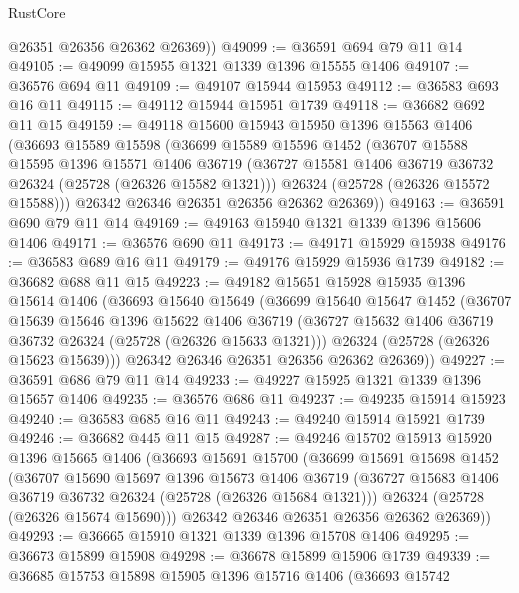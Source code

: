 \begin{lexlean}{RustCore}
\begin{coremodule}
        @26351
        @26356
        @26362
        @26369))
@49099 := @36591 @694 @79 @11 @14
@49105 := @49099 @15955 @1321 @1339 @1396 @15555 @1406
@49107 := @36576 @694 @11
@49109 := @49107 @15944 @15953
@49112 := @36583 @693 @16 @11
@49115 := @49112 @15944 @15951 @1739
@49118 := @36682 @692 @11 @15
@49159 := @49118
    @15600
    @15943
    @15950
    @1396
    @15563
    @1406
    (@36693
      @15589
      @15598
      (@36699
        @15589
        @15596
        @1452
        (@36707
          @15588
          @15595
          @1396
          @15571
          @1406
          @36719
          (@36727 @15581 @1406 @36719 @36732 @26324 (@25728 (@26326 @15582 @1321)))
          @26324
          (@25728 (@26326 @15572 @15588)))
        @26342
        @26346
        @26351
        @26356
        @26362
        @26369))
@49163 := @36591 @690 @79 @11 @14
@49169 := @49163 @15940 @1321 @1339 @1396 @15606 @1406
@49171 := @36576 @690 @11
@49173 := @49171 @15929 @15938
@49176 := @36583 @689 @16 @11
@49179 := @49176 @15929 @15936 @1739
@49182 := @36682 @688 @11 @15
@49223 := @49182
    @15651
    @15928
    @15935
    @1396
    @15614
    @1406
    (@36693
      @15640
      @15649
      (@36699
        @15640
        @15647
        @1452
        (@36707
          @15639
          @15646
          @1396
          @15622
          @1406
          @36719
          (@36727 @15632 @1406 @36719 @36732 @26324 (@25728 (@26326 @15633 @1321)))
          @26324
          (@25728 (@26326 @15623 @15639)))
        @26342
        @26346
        @26351
        @26356
        @26362
        @26369))
@49227 := @36591 @686 @79 @11 @14
@49233 := @49227 @15925 @1321 @1339 @1396 @15657 @1406
@49235 := @36576 @686 @11
@49237 := @49235 @15914 @15923
@49240 := @36583 @685 @16 @11
@49243 := @49240 @15914 @15921 @1739
@49246 := @36682 @445 @11 @15
@49287 := @49246
    @15702
    @15913
    @15920
    @1396
    @15665
    @1406
    (@36693
      @15691
      @15700
      (@36699
        @15691
        @15698
        @1452
        (@36707
          @15690
          @15697
          @1396
          @15673
          @1406
          @36719
          (@36727 @15683 @1406 @36719 @36732 @26324 (@25728 (@26326 @15684 @1321)))
          @26324
          (@25728 (@26326 @15674 @15690)))
        @26342
        @26346
        @26351
        @26356
        @26362
        @26369))
@49293 := @36665 @15910 @1321 @1339 @1396 @15708 @1406
@49295 := @36673 @15899 @15908
@49298 := @36678 @15899 @15906 @1739
@49339 := @36685
    @15753
    @15898
    @15905
    @1396
    @15716
    @1406
    (@36693
      @15742

\end{coremodule}
\end{lexlean}

